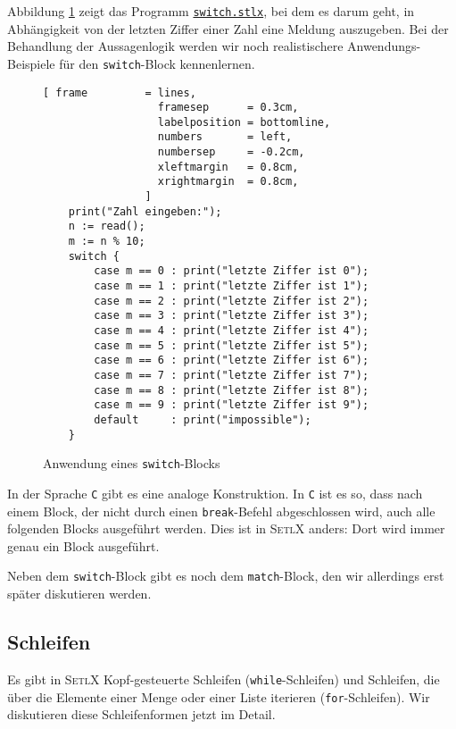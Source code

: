 Abbildung \ref{fig:switch.stlx} zeigt das Programm
\href{https://github.com/karlstroetmann/Logik/blob/master/SetlX/switch.stlx}{\texttt{switch.stlx}},
bei dem es darum  geht, in Abh\"{a}ngigkeit von der letzten Ziffer einer Zahl eine Meldung auszugeben.  Bei
der Behandlung der Aussagenlogik werden wir noch realistischere Anwendungs-Beispiele f\"{u}r den
\texttt{switch}-Block kennenlernen.

\begin{figure}[!ht]
\centering
\begin{Verbatim}[ frame         = lines, 
                  framesep      = 0.3cm, 
                  labelposition = bottomline,
                  numbers       = left,
                  numbersep     = -0.2cm,
                  xleftmargin   = 0.8cm,
                  xrightmargin  = 0.8cm,
                ]
    print("Zahl eingeben:");
    n := read();
    m := n % 10;
    switch {
        case m == 0 : print("letzte Ziffer ist 0");
        case m == 1 : print("letzte Ziffer ist 1");
        case m == 2 : print("letzte Ziffer ist 2");
        case m == 3 : print("letzte Ziffer ist 3");
        case m == 4 : print("letzte Ziffer ist 4");
        case m == 5 : print("letzte Ziffer ist 5");
        case m == 6 : print("letzte Ziffer ist 6");
        case m == 7 : print("letzte Ziffer ist 7");
        case m == 8 : print("letzte Ziffer ist 8");
        case m == 9 : print("letzte Ziffer ist 9");
        default     : print("impossible");
    }
\end{Verbatim}
\vspace*{-0.3cm}
\caption{Anwendung eines \texttt{switch}-Blocks}
\label{fig:switch.stlx}
\end{figure}

In der Sprache \texttt{C} gibt es eine  analoge Konstruktion.
 In \texttt{C} ist es so, dass nach einem
Block, der nicht durch einen \texttt{break}-Befehl abgeschlossen wird, auch alle folgenden Blocks
ausgef\"{u}hrt werden.  Dies ist in \textsc{SetlX} anders: Dort wird immer genau ein Block
ausgef\"{u}hrt.

Neben dem \texttt{switch}-Block gibt es noch dem \texttt{match}-Block, den wir allerdings
erst sp\"{a}ter diskutieren werden.

\subsection{Schleifen}
Es gibt in \textsc{SetlX} Kopf-gesteuerte Schleifen (\texttt{while}-Schleifen)
und Schleifen, die \"{u}ber die Elemente einer Menge oder einer Liste  iterieren (\texttt{for}-Schleifen).
Wir diskutieren diese  Schleifenformen jetzt im Detail.

